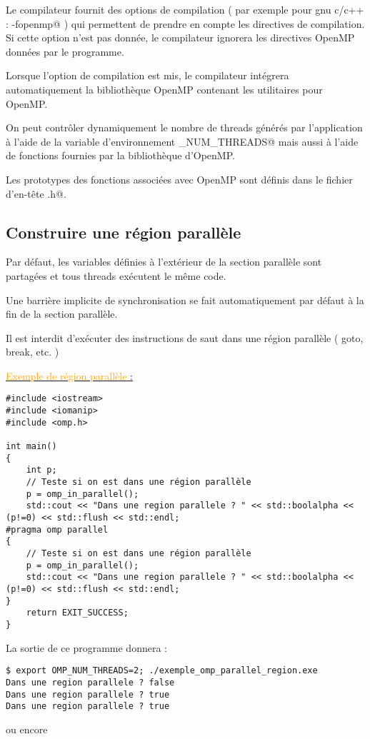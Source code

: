 \documentclass[fleqn,11pt]{article}
\begin{document}
Le compilateur fournit des options de compilation ( par exemple pour gnu c/c++ : \verb@-fopenmp@ ) qui permettent de prendre en compte
les directives de compilation. Si cette option n'est pas donnée, le compilateur ignorera les directives OpenMP données par le programme.

Lorsque l'option de compilation est mis, le compilateur intégrera automatiquement la bibliothèque OpenMP contenant les utilitaires pour
OpenMP. 

On peut contrôler dynamiquement le nombre de threads générés par l'application à l'aide de 
la variable d'environnement \verb@OMP_NUM_THREADS@ mais aussi à l'aide de fonctions fournies par la bibliothèque d'OpenMP.

Les prototypes des fonctions associées avec OpenMP sont définis dans le fichier d'en-tête \lstinline@omp.h@.

\subsection{Construire une région parallèle}

Par défaut, les variables définies à l'extérieur de la section parallèle
sont partagées et tous threads exécutent le même code.

Une barrière implicite de synchronisation se fait automatiquement par défaut à la fin de la section parallèle.

Il est interdit d'exécuter des instructions de saut dans une région parallèle ( goto, break, etc. )

\underline{\textcolor{orange}{Exemple de région parallèle} :}
\begin{lstlisting}
#include <iostream>
#include <iomanip>
#include <omp.h>

int main()
{
    int p;
    // Teste si on est dans une région parallèle
    p = omp_in_parallel();
    std::cout << "Dans une region parallele ? " << std::boolalpha << (p!=0) << std::flush << std::endl;
#pragma omp parallel
{
    // Teste si on est dans une région parallèle
    p = omp_in_parallel();
    std::cout << "Dans une region parallele ? " << std::boolalpha << (p!=0) << std::flush << std::endl;
}
    return EXIT_SUCCESS;
}\end{lstlisting}

La sortie de ce programme donnera :
\begin{verbatim}
$ export OMP_NUM_THREADS=2; ./exemple_omp_parallel_region.exe
Dans une region parallele ? false
Dans une region parallele ? true
Dans une region parallele ? true
\end{verbatim}
 ou encore
\end{document}
